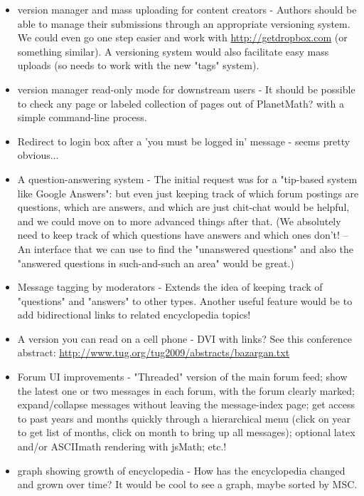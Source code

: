 \begin{itemize}
\item version manager and mass uploading for content creators - Authors should be able to manage their submissions through an appropriate versioning system. We could even go one step easier and work with \url{http://getdropbox.com} (or something similar). A versioning system would also facilitate easy mass uploads (so needs to work with the new "tags" system). 

\item version manager read-only mode for downstream users - It should be possible to check any page or labeled collection of pages out of PlanetMath? with a simple command-line process. 

\item Redirect to login box after a 'you must be logged in' message - seems pretty obvious... 

\item A question-answering system - The initial request was for a "tip-based system like Google Answers": but even just keeping track of which forum postings are questions, which are answers, and which are just chit-chat would be helpful, and we could move on to more advanced things after that. (We absolutely need to keep track of which questions have answers and which ones don't! -- An interface that we can use to find the "unanswered questions" and also the "answered questions in such-and-such an area" would be great.) 

\item Message tagging by moderators - Extends the idea of keeping track of "questions" and "answers" to other types. Another useful feature would be to add bidirectional links to related encyclopedia topics! 

\item A version you can read on a cell phone - DVI with links? See this conference abstract: \url{http://www.tug.org/tug2009/abstracts/bazargan.txt} 

\item Forum UI improvements - "Threaded" version of the main forum feed; show the latest one or two messages in each forum, with the forum clearly marked; expand/collapse messages without leaving the message-index page; get access to past years and months quickly through a hierarchical menu (click on year to get list of months, click on month to bring up all messages); optional latex and/or ASCIImath rendering with jsMath; etc.! 

\item graph showing growth of encyclopedia - How has the encyclopedia changed and grown over time? It would be cool to see a graph, maybe sorted by MSC. 


\end{itemize}
